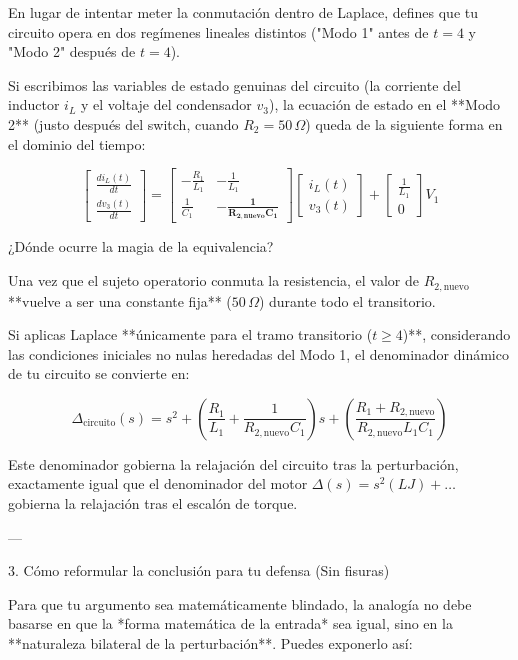 \documentclass[11pt, a4paper]{article}
\theoremstyle{definition}
\theoremstyle{plain}
\theoremstyle{plain}
\theoremstyle{remark}
\theoremstyle{remark}
\theoremstyle{remark}
\begin{document}
En lugar de intentar meter la conmutación dentro de Laplace, defines que tu circuito opera en dos regímenes lineales distintos ("Modo 1" antes de $t=4$ y "Modo 2" después de $t=4$).

Si escribimos las variables de estado genuinas del circuito (la corriente del inductor $i_L$ y el voltaje del condensador $v_3$), la ecuación de estado en el **Modo 2** (justo después del switch, cuando $R_2 = 50\,\Omega$) queda de la siguiente forma en el dominio del tiempo:

$$\begin{bmatrix} \frac{di_L(t)}{dt} \\ \frac{dv_3(t)}{dt} \end{bmatrix} = \begin{bmatrix} -\frac{R_1}{L_1} & -\frac{1}{L_1} \\ \frac{1}{C_1} & \mathbf{-\frac{1}{R_{2,\text{nuevo}}C_1}} \end{bmatrix} \begin{bmatrix} i_L(t) \\ v_3(t) \end{bmatrix} + \begin{bmatrix} \frac{1}{L_1} \\ 0 \end{bmatrix} V_1$$

¿Dónde ocurre la magia de la equivalencia?

Una vez que el sujeto operatorio conmuta la resistencia, el valor de $R_{2,\text{nuevo}}$ **vuelve a ser una constante fija** ($50\,\Omega$) durante todo el transitorio.

Si aplicas Laplace **únicamente para el tramo transitorio ($t \ge 4$)**, considerando las condiciones iniciales no nulas heredadas del Modo 1, el denominador dinámico de tu circuito se convierte en:

$$\Delta_{\text{circuito}}(s) = s^2 + \left( \frac{R_1}{L_1} + \frac{1}{R_{2,\text{nuevo}}C_1} \right)s + \left( \frac{R_1 + R_{2,\text{nuevo}}}{R_{2,\text{nuevo}}L_1C_1} \right)$$

Este denominador gobierna la relajación del circuito tras la perturbación, exactamente igual que el denominador del motor $\Delta(s) = s^2(LJ) + \dots$ gobierna la relajación tras el escalón de torque.

---

3. Cómo reformular la conclusión para tu defensa (Sin fisuras)

Para que tu argumento sea matemáticamente blindado, la analogía no debe basarse en que la *forma matemática de la entrada* sea igual, sino en la **naturaleza bilateral de la perturbación**. Puedes exponerlo así:
\end{document}
